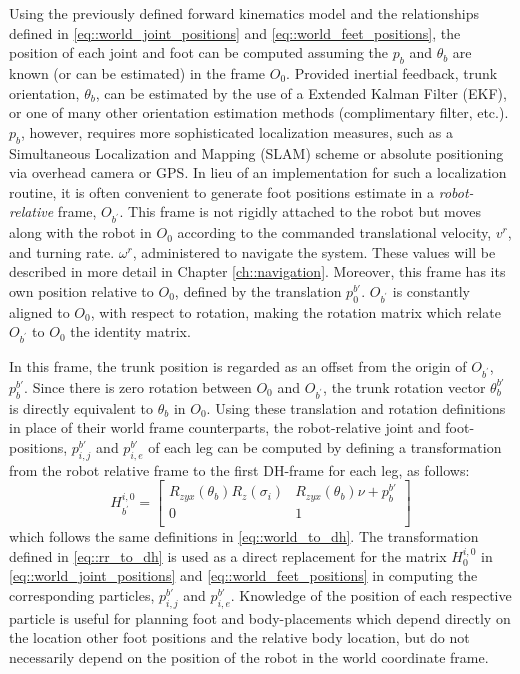 			Using the previously defined forward kinematics model and the relationships defined in \ref{eq::world_joint_positions} and \ref{eq::world_feet_positions}, the position of each joint and foot can be computed assuming the $p_{b}$ and $\theta_{b}$ are known (or can be estimated) in the frame $O_{0}$. Provided inertial feedback, trunk orientation, $\theta_{b}$, can be estimated by the use of a Extended Kalman Filter (EKF), or one of many other orientation estimation methods (\IE complimentary filter, etc.). $p_{b}$, however, requires more sophisticated localization measures, such as a Simultaneous Localization and Mapping (SLAM) scheme or absolute positioning via overhead camera or GPS. In lieu of an implementation for such a localization routine, it is often convenient to generate foot positions estimate in a \emph{robot-relative} frame, $O_{b^{'}}$. This frame is not rigidly attached to the robot but moves along with the robot in $O_{0}$ according to the commanded translational velocity, $v^{r}$, and turning rate. $\omega^{r}$, administered to navigate the system. These values will be described in more detail in Chapter \ref{ch::navigation}. Moreover, this frame has its own position relative to $O_{0}$, defined by the translation $p_{0}^{b'}$. $O_{b^{'}}$ is constantly aligned to $O_{0}$, with respect to rotation, making the rotation matrix which relate $O_{b^{'}}$ to $O_{0}$ the identity matrix.

			In this frame, the trunk position is regarded as an offset from the origin of $O_{b^{'}}$, $p_{b}^{b'}$. Since there is zero rotation between $O_{0}$ and $O_{b^{'}}$, the trunk rotation vector $\theta_{b}^{b'}$ is directly equivalent to $\theta_{b}$ in $O_{0}$. Using these translation and rotation definitions in place of their world frame counterparts, the robot-relative joint and foot-positions, ${p}_{i,j}^{b'}$ and ${p}_{i,e}^{b'}$ of each \Ith leg can be computed by defining a transformation from the robot relative frame to the first DH-frame for each leg, as follows:
				\begin{equation}
					H_{b^{'}}^{i,0} = 
					\left[ 
					\begin{array}{c|c}
						R_{zyx}(\theta_{b}) R_{z}(\sigma_{i})	&R_{zyx}(\theta_{b}) \nu + {p}_{b}^{b'} 	\\ \hline
						0										&	1												\\
					\end{array} 
					\right]
					\label{eq::rr_to_dh}
				\end{equation}
			which follows the same definitions in \ref{eq::world_to_dh}.
			The transformation defined in \ref{eq::rr_to_dh} is used as a direct replacement for the matrix $H_{0}^{i,0}$ in \ref{eq::world_joint_positions} and \ref{eq::world_feet_positions} in computing the corresponding particles, ${p}_{i,j}^{b'}$ and ${p}_{i,e}^{b'}$. Knowledge of the position of each respective particle is useful for planning foot and body-placements which depend directly on the location other foot positions and the relative body location, but do not necessarily depend on the position of the robot in the world coordinate frame.
 
